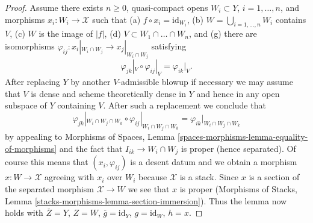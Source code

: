 \begin{proof}
\medskip\noindent
Assume there exists $n \geq 0$, quasi-compact opens
$W_i \subset Y$, $i = 1, \ldots, n$, and
morphisms $x_i : W_i \to \mathcal{X}$ such that
(a) $f \circ x_i = \text{id}_{W_i}$,
(b) $W = \bigcup_{i = 1, \ldots, n} W_i$ contains $V$,
(c) $W$ is the image of $|f|$,
(d) $V \subset W_1 \cap \ldots \cap W_n$, and
(g) there are isomorphisms
$\varphi_{ij} : x_i|_{W_i \cap W_j} \to x_j|_{W_i \cap W_j}$
satisfying
$$
\varphi_{jk}|_V \circ \varphi_{ij}|_V = \varphi_{ik}|_V.
$$
After replacing $Y$ by another $V$-admissible blowup if necessary
we may assume that $V$ is dense and scheme theoretically dense
in $Y$ and hence in any open subspace of $Y$ containing $V$.
After such a replacement we conclude that
$$
\varphi_{jk}|_{W_i \cap W_j \cap W_k} \circ
\varphi_{ij}|_{W_i \cap W_j \cap W_k} =
\varphi_{ik}|_{W_i \cap W_j \cap W_k}
$$
by appealing to Morphisms of Spaces, Lemma
\ref{spaces-morphisms-lemma-equality-of-morphisms}
and the fact that $I_{ik} \to W_i \cap W_j$ is proper
(hence separated).
Of course this means that $(x_i, \varphi_{ij})$
is a desent datum and we obtain a morphism
$x : W \to \mathcal{X}$ agreeing with $x_i$ over $W_i$
because $\mathcal{X}$ is a stack.
Since $x$ is a section of the separated morphism
$\mathcal{X} \to W$ we see that $x$ is proper
(Morphisms of Stacks, Lemma \ref{stacks-morphisms-lemma-section-immersion}).
Thus the lemma now holds with $\overline{Z} = Y$,
$Z = W$, $\overline{g} = \text{id}_Y$, $g = \text{id}_W$,
$h = x$.
\end{proof}
